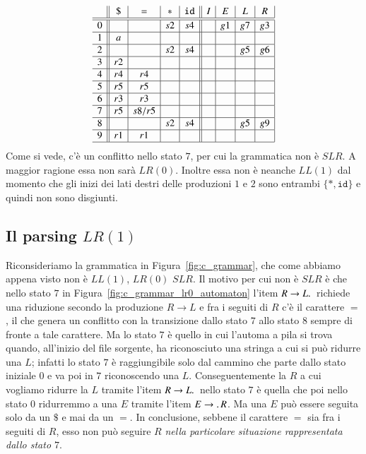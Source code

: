 \[
\begin{array}{c||c|c|c|c||c|c|c|c|}
  & \mathtt{\$} & \mathtt{=} & \mathtt{*} & \mathtt{id} & I  & E  & L  & R  \\\hline\hline
0 &             &            & s2         & s4          &    & g1 & g7 & g3 \\\hline
1 & a           &            &            &             &    &    &    &    \\\hline
2 &             &            & s2         & s4          &    &    & g5 & g6 \\\hline
3 & r2          &            &            &             &    &    &    &    \\\hline
4 & r4          & r4         &            &             &    &    &    &    \\\hline
5 & r5          & r5         &            &             &    &    &    &    \\\hline
6 & r3          & r3         &            &             &    &    &    &    \\\hline
7 & r5          & s8/r5      &            &             &    &    &    &    \\\hline
8 &             &            & s2         & s4          &    &    & g5 & g9 \\\hline
9 & r1          & r1         &            &             &    &    &    &    \\\hline
\end{array}
\]
%
Come si vede, c'\`e un conflitto nello stato $7$, per cui la grammatica
non \`e $\mathit{SLR}$. A maggior ragione essa non sar\`a $\mathit{LR}(0)$.
Inoltre essa non \`e neanche $\mathit{LL}(1)$ dal momento che gli inizi dei
lati destri delle produzioni $1$ e $2$ sono entrambi
$\{\mathtt{*},\mathtt{id}\}$ e quindi non sono disgiunti.
%
\subsection{Il parsing $\mathit{LR}(1)$}\label{subsec:lr1}
%
Riconsideriamo la grammatica in Figura~\ref{fig:c_grammar}, che come abbiamo
appena visto non \`e \nec $\mathit{LL}(1)$,
\nec $\mathit{LR}(0)$ \nec $\mathit{SLR}$.
Il motivo per cui non \`e $\mathit{SLR}$ \`e che nello stato $7$ in
Figura~\ref{fig:c_grammar_lr0_automaton} l'item $R\to L.\,$ richiede
una riduzione secondo la produzione $R\to L$ e fra i seguiti di $R$
c'\`e il carattere $\mathtt{=}$, il che genera un conflitto con la
transizione dallo stato $7$ allo stato $8$ sempre di fronte a tale carattere.
Ma lo stato $7$ \`e quello in cui l'automa a pila si trova quando,
all'inizio del file sorgente, ha riconosciuto una stringa a cui si
pu\`o ridurre una $L$; infatti lo stato $7$ \`e raggiungibile solo dal
cammino che parte dallo stato iniziale $0$ e va poi in $7$ riconoscendo
una $L$. Conseguentemente la $R$ a cui vogliamo ridurre la $L$ tramite
l'item $R\to L.\,$ nello stato $7$ \`e quella che poi nello stato $0$
ridurremmo a una $E$ tramite l'item $E\to.\, R$. Ma una $E$ pu\`o essere
seguita solo da un $\mathtt{\$}$ e mai da un $\mathtt{=}$. In conclusione,
sebbene il carattere $\mathtt{=}$ sia fra i seguiti di $R$, esso non pu\`o
seguire $R$ \emph{nella particolare situazione rappresentata dallo stato $7$}.

